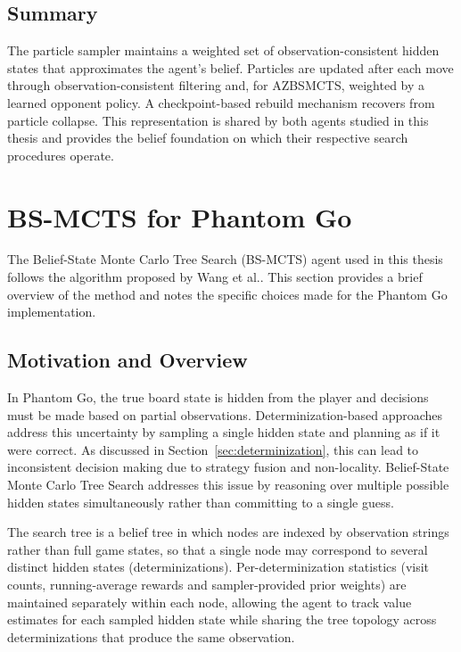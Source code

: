 \documentclass[12pt,oneside,openright]{article}
\begin{document}
\subsection{Summary}

The particle sampler maintains a weighted set of observation-consistent hidden states that approximates the agent's belief. Particles are updated after each move through observation-consistent filtering and, for AZBSMCTS, weighted by a learned opponent policy. A checkpoint-based rebuild mechanism recovers from particle collapse. This representation is shared by both agents studied in this thesis and provides the belief foundation on which their respective search procedures operate.

\section{BS-MCTS for Phantom Go}
\label{sec:bs_mcts}

The Belief-State Monte Carlo Tree Search (BS-MCTS) agent used in this thesis follows the algorithm proposed by Wang et al.\cite{Wang2015bsmcts}. This section provides a brief overview of the method and notes the specific choices made for the Phantom Go implementation.

\subsection{Motivation and Overview}

In Phantom Go, the true board state is hidden from the player and decisions must be made based on partial observations. Determinization-based approaches address this uncertainty by sampling a single hidden state and planning as if it were correct. As discussed in Section~\ref{sec:determinization}, this can lead to inconsistent decision making due to strategy fusion and non-locality\cite{Cowling2012ismcts}.
Belief-State Monte Carlo Tree Search addresses this issue by reasoning over multiple possible hidden states simultaneously rather than committing to a single guess.

The search tree is a belief tree in which nodes are indexed by observation strings rather than full game states, so that a single node may correspond to several distinct hidden states (determinizations). Per-determinization statistics (visit counts, running-average rewards and sampler-provided prior weights) are maintained separately within each node, allowing the agent to track value estimates for each sampled hidden state while sharing the tree topology across determinizations that produce the same observation\cite[Sec.~3]{Wang2015bsmcts}.
\end{document}
